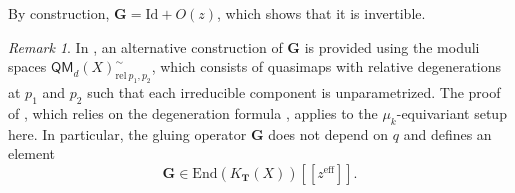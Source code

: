 \documentclass[reqno]{amsart}
\numberwithin{equation}{section}
\numberwithin{equation}{section}
\numberwithin{equation}{section}
\theoremstyle{definition}
\theoremstyle{remark}
\theoremstyle{remark}
\newtheorem{rem}[thm]{Remark}
\begin{document}
By construction, $\mathbf{G} = \mathrm{Id} + O(z)$, which shows that it is invertible. 

\begin{rem}
    In \cite[Section 6.5]{Oko17}, an alternative construction of $\mathbf{G}$ is provided using the moduli spaces $\mathsf{QM}_d(X)^{\sim}_{\mathrm{rel} \ p_1, p_2}$, which consists of quasimaps with relative degenerations at $p_1$ and $p_2$ such that each irreducible component is unparametrized. The proof of \cite[Theorem 7.1.4]{Oko17}, which relies on the degeneration formula \cite[Proposition 6.5.27]{Oko17}, applies to the $\mu_k$-equivariant setup here. In particular, the gluing operator $\mathbf{G}$ does not depend on $q$ and defines an element 
    \begin{equation}
    \mathbf{G} \in \mathrm{End}(K_{\mathbf{T}}(X))[\![ z^{\mathrm{eff}} ]\!].
\end{equation}
\end{rem}
\end{document}
